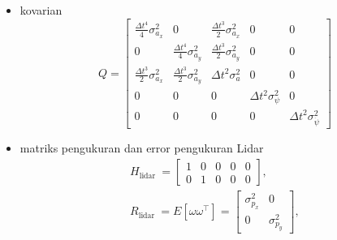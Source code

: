 \begin{frame}[allowframebreaks]
\begin{itemize}
\begin{equation}
\begin{array}{c}
            \frac{1}{2}(\Delta t)^{2} \cos \left(\psi_{k}\right) \nu_{a, k} \\
            \frac{1}{2}(\Delta t)^{2} \sin \left(\psi_{k}\right) \nu_{a, k} \\
            \Delta t \nu_{a, k} \\
            \frac{1}{2}(\Delta t)^{2} \nu_{\ddot{\psi}, k} \\
            \Delta t \nu_{\ddot{\psi}, k}
            \end{array}\right]
            \label{eq: 2-LREKF-state-noise}
        \end{equation}
        \item kovarian
        \begin{equation}
            Q=\left[\begin{array}{ccccc}
                \frac{\Delta t^{4}}{4} \sigma_{a_{x}}^{2} & 0 & \frac{\Delta t^{3}}{2} \sigma_{a_{x}}^{2} & 0 & 0 \\
                0 & \frac{\Delta t^{4}}{4} \sigma_{a_{y}}^{2} & \frac{\Delta t^{3}}{2} \sigma_{a_{y}}^{2} & 0 & 0 \\
                \frac{\Delta t^{3}}{2} \sigma_{a_{x}}^{2} & \frac{\Delta t^{3}}{2} \sigma_{a_{y}}^{2} & \Delta t^{2} \sigma_{a}^{2} & 0 & 0 \\
                0 & 0 & 0 & \Delta t^{2} \sigma_{\psi}^{2} & 0 \\
                0 & 0 & 0 & 0 & \Delta t^{2} \sigma_{\dot{\psi}}^{2}
                \label{eq: 2-LREKF-state-cov}
            \end{array}\right]
        \end{equation}
        \item matriks pengukuran dan error pengukuran Lidar
        \begin{equation}
            \begin{array}{l}
            H_{\text {lidar }}=\left[\begin{array}{lllll}
            1 & 0 & 0 & 0 & 0 \\
            0 & 1 & 0 & 0 & 0
            \end{array}\right], \\
            R_{\text {lidar }}=E\left[\omega \omega^{\top}\right]=\left[\begin{array}{cc}
            \sigma_{p_{x}}^{2} & 0 \\
            0 & \sigma_{p_{y}}^{2}
            \end{array}\right],
            \end{array}

\end{equation}
\end{itemize}
\end{frame}
